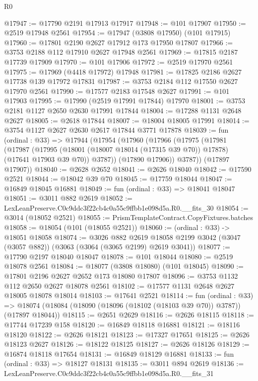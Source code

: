 \begin{lexlean}{R0}
\begin{coremodule}
@17947 := @17790 @2191 @17913 @17917
@17948 := @101 @17907
@17950 := @2519 @17948 @2561
@17954 := @17947 (@3808 @17950) (@101 @17915)
@17960 := @17801 @2190 @2627 @17912 @173 @17950 @17807
@17966 := @3753 @2188 @112 @17910 @2627 @17948 @2561
@17969 := @17815 @2187 @17739 @17909
@17970 := @101 @17906
@17972 := @2519 @17970 @2561
@17975 := @17969 (@4418 @17972) @17948
@17981 := @17825 @2186 @2627 @17738 @139 @17972 @17831
@17987 := @3753 @2184 @112 @17550 @2627 @17970 @2561
@17990 := @17577 @2183 @17548 @2627
@17991 := @101 @17903
@17995 := @17990 (@2519 @17991 @17844) @17970
@18001 := @3753 @2181 @1127 @2650 @2630 @17991 @17844
@18004 := @17288 @1131 @2648 @2627
@18005 := @2618 @17844
@18007 := @18004 @18005 @17991
@18014 := @3754 @1127 @2627 @2630 @2617 @17844 @3771 @17878
@18039 := fun (ordinal : @33) =>
  @17944
    (@17954
      (@17960
        (@17966
          (@17975
            (@17981
              (@17987
                (@17995 (@18001 (@18007 @18014 (@17315 @39 @70)) @17878) (@17641 @17903 @39 @70))
                @3787))
            (@17890 @17906))
          @3787))
      (@17897 @17907))
@18040 := @2628 @2652
@18041 := @2626 @18040
@18042 := @17590 @2521
@18044 := @18042 @39 @70
@18045 := @17759 @18044
@18047 := @16849 @18045 @16881
@18049 := fun (ordinal : @33) => @18041 @18047
@18051 := @3011 @882 @2619
@18052 := LexLeanPreserve.C0c9ddc3f22cb4c0a55c9ffbb1e098d5a.R0.__fits_30
@18054 := @3014 (@18052 @2521)
@18055 := PrismTemplateContract.CopyFixtures.batches
@18058 := @18054 (@101 (@18055 @2521))
@18060 := (ordinal : @33) -> @18051 @18058
@18074 := @3026
    @882
    @2619
    @18058
    @2199
    @3042
    (@3047 (@3057 @882))
    (@3063 (@3064 (@3065 @2199) @2619 @3041))
@18077 := @17790 @2197 @18040 @18047
@18078 := @101 @18044
@18080 := @2519 @18078 @2561
@18084 := @18077 (@3808 @18080) (@101 @18045)
@18090 := @17801 @2196 @2627 @2652 @173 @18080 @17807
@18096 := @3753 @1132 @112 @2650 @2627 @18078 @2561
@18102 := @17577 @1131 @2648 @2627 @18005 @18078 @18014
@18103 := @17641 @2521
@18114 := fun (ordinal : @33) =>
  @18074 (@18084 (@18090 (@18096 (@18102 (@18103 @39 @70)) @3787)) (@17897 @18044))
@18115 := @2651 @2629
@18116 := @2626 @18115
@18118 := @17744 @17239 @158
@18120 := @16849 @18118 @16881
@18121 := @18116 @18120
@18122 := @2626 @18121
@18123 := @17327 @17651
@18125 := @2626 @18123 @2627
@18126 := @18122 @18125
@18127 := @2626 @18126
@18129 := @16874 @18118 @17654
@18131 := @16849 @18129 @16881
@18133 := fun (ordinal : @33) => @18127 @18131
@18135 := @3011 @894 @2619
@18136 := LexLeanPreserve.C0c9ddc3f22cb4c0a55c9ffbb1e098d5a.R0.__fits_31

\end{coremodule}
\end{lexlean}
